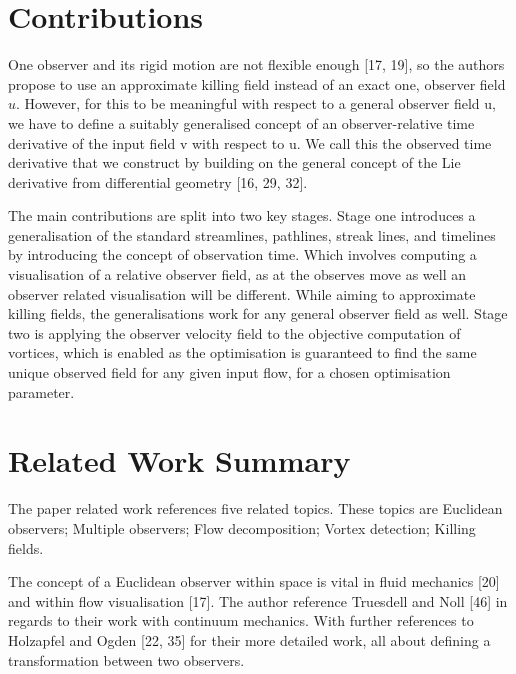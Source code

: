 \documentclass[a4paper,9pt]{article}
\begin{document}
\section{Contributions}
One observer and its rigid motion are not flexible enough [17, 19], so the authors propose to use an approximate killing field instead of an exact one, observer field $u$. However, for this to be meaningful with respect to a general observer field u, we have to define a suitably generalised concept of an observer-relative time derivative of the input field v with respect to u. We call this the observed time derivative that we construct by building on the general concept of the Lie derivative from differential geometry [16, 29, 32].

The main contributions are split into two key stages. Stage one introduces a generalisation of the standard streamlines, pathlines, streak lines, and timelines by introducing the concept of observation time. Which involves computing a visualisation of a relative observer field, as at the observes move as well an observer related visualisation will be different. While aiming to approximate killing fields, the generalisations work for any general observer field as well. Stage two is applying the observer velocity field to the objective computation of vortices, which is enabled as the optimisation is guaranteed to find the same unique observed field for any given input flow, for a chosen optimisation parameter.

\section{Related Work Summary}

The paper related work references five related topics. These topics are Euclidean observers; Multiple observers; Flow decomposition; Vortex detection; Killing fields.

The concept of a Euclidean observer within space is vital in fluid mechanics [20] and within flow visualisation [17]. The author reference Truesdell and Noll [46] in regards to their work with continuum mechanics. With further references to Holzapfel and Ogden [22, 35] for their more detailed work, all about defining a transformation between two observers.
\end{document}
